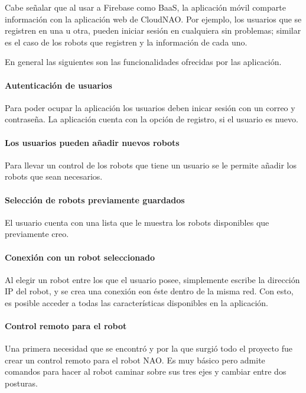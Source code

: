 Cabe señalar que al usar a Firebase como BaaS, la aplicación móvil
comparte información con la aplicación web de CloudNAO. Por ejemplo, los
usuarios que se registren en una u otra, pueden iniciar sesión en cualquiera
sin problemas; similar es el caso de los robots que registren y la información
de cada uno.

En general las siguientes son las funcionalidades ofrecidas por las aplicación.


\paragraph{Autenticación de usuarios}
\label{\detokenize{users_docs:autenticacion-de-usuarios}}
Para poder ocupar la aplicación los usuarios deben inicar sesión con un correo
y contraseña. La aplicación cuenta con la opción de registro, si el usuario
es nuevo.


\paragraph{Los usuarios pueden añadir nuevos robots}
\label{\detokenize{users_docs:los-usuarios-pueden-anadir-nuevos-robots}}
Para llevar un control de los robots que tiene un usuario se le permite añadir
los robots que sean necesarios.


\paragraph{Selección de robots previamente guardados}
\label{\detokenize{users_docs:seleccion-de-robots-previamente-guardados}}
El usuario cuenta con una lista que le muestra los robots disponibles
que previamente creo.


\paragraph{Conexión con un robot seleccionado}
\label{\detokenize{users_docs:conexion-con-un-robot-seleccionado}}
Al elegir un robot entre los que el usuario posee, simplemente escribe la
dirección IP del robot, y se crea una conexión eon éste dentro de la misma
red. Con esto, es posible acceder a todas las características disponibles en la
aplicación.


\paragraph{Control remoto para el robot}
\label{\detokenize{users_docs:control-remoto-para-el-robot}}
Una primera necesidad que se encontró y por la que surgió todo el proyecto
fue crear un control remoto para el robot NAO. Es muy básico pero admite
comandos para hacer al robot caminar sobre sus tres ejes y cambiar entre dos
posturas.



